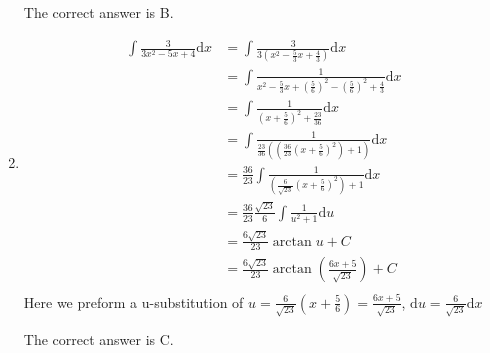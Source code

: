 \documentclass{article}
\numberwithin{equation}{section}
\begin{document}
\begin{enumerate}
    The correct answer is B.
    \item \begin{align*}
        \int \frac{3}{3x^2-5x+4}\mathrm{d}x &= \int \frac{3}{3(x^2-\frac{5}{3}x+\frac{4}{3})}\mathrm{d}x\\
        &= \int \frac{1}{x^2 - \frac{5}{3}x + \left(\frac{5}{6}\right)^2 - \left(\frac{5}{6}\right)^2 + \frac{4}{3}}\mathrm{d}x\\
        &= \int \frac{1}{\left(x+\frac{5}{6}\right)^2 + \frac{23}{36}}\mathrm{d}x\\
        &=\int \frac{1}{\frac{23}{36}\left(\left(\frac{36}{23}\left(x+\frac{5}{6}\right)^2\right)+1\right)}\mathrm{d}x\\
        &= \frac{36}{23} \int \frac{1}{\left(\frac{6}{\sqrt{23}}\left(x+\frac{5}{6}\right)^2\right)+1}\mathrm{d}x\\
        &=\frac{36}{23}\frac{\sqrt{23}}{6}\int\frac{1}{u^2+1}\mathrm{d}u\\
        &= \frac{6\sqrt{23}}{23}\arctan u + C\\
        &= \frac{6\sqrt{23}}{23}\arctan \left(\frac{6x+5}{\sqrt{23}}\right) +C\\
    \end{align*}
    Here we preform a u-substitution of $\displaystyle u = \frac{6}{\sqrt{23}}\left(x+\frac{5}{6}\right) = \frac{6x+5}{\sqrt{23}}$, $\displaystyle\mathrm{d}u = \frac{6}{\sqrt{23}}\mathrm{d}x$
    
    The correct answer is C.
\end{enumerate}
\end{document}
